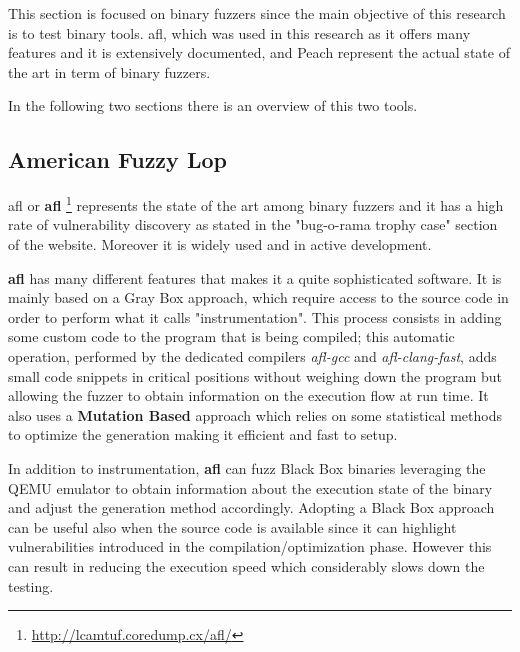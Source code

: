 \documentclass[../main.tex]{subfiles}
\begin{document}
This section is focused on binary fuzzers since the main objective of this research is to test binary tools.
\acrlong{afl}, which was used in this research as it offers many features and it is extensively documented, and Peach represent the actual state of the art in term of binary fuzzers.

In the following two sections there is an overview of this two tools.

\subsection{American Fuzzy Lop}

\acrlong{afl} or \textbf{\acrshort{afl}} \footnote{\url{http://lcamtuf.coredump.cx/afl/}} represents the state of the art among binary fuzzers and it has a high rate of vulnerability discovery as stated in the "bug-o-rama trophy case" section of the website. Moreover it is widely used and in active development.

\textbf{\acrshort{afl}} has many different features that makes it a quite sophisticated software. It is mainly based on a Gray Box approach, which require access to the source code in order to perform what it calls "instrumentation". This process consists in adding some custom code to the program that is being compiled; this automatic operation, performed by the dedicated compilers \textit{afl-gcc} and \textit{afl-clang-fast}, adds small code snippets in critical positions without weighing down the program but allowing the fuzzer to obtain information on the execution flow at run time. It also uses a \textbf{Mutation Based} approach which relies on  some statistical methods to optimize the generation making it efficient and fast to setup.

In addition to instrumentation, \textbf{\acrshort{afl}} can fuzz Black Box binaries leveraging the QEMU emulator to obtain information about the execution state of the binary and adjust the generation method accordingly. Adopting a Black Box approach can be useful also when the source code is available since it can highlight vulnerabilities introduced in the compilation/optimization phase. However this can result in reducing the execution speed which considerably slows down the testing.
\end{document}
